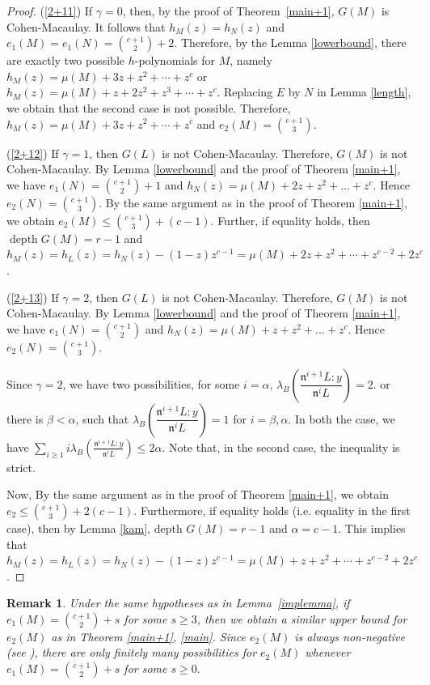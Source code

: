\documentclass[11pt]{amsart}
\theoremstyle{plain}
\newtheorem{remark}[theorem]{Remark}
\newcommand{\n}{\mathfrak{n}}
\newcommand{\depth}{\operatorname{depth}}
\theoremstyle{plain}
\begin{document}
\begin{proof}
   (\ref{2+11}) If $\gamma=0$, then, by the proof of Theorem~\ref{main+1}, $G(M)$ is Cohen-Macaulay. It follows that $h_M(z)=h_N(z)$ and $ e_1(M)=e_1(N)=\binom{c+1}{2}+2$. Therefore, by the Lemma \ref{lowerbound}, there are exactly two possible $h$-polynomials for $M$, namely $h_M(z)=\mu(M)+3z+z^2+\cdots+z^c$ or $h_M(z)=\mu(M)+z+2z^2+z^3+\cdots+z^c$. Replacing $E$ by $N$ in Lemma \ref{length}, we obtain that the second case is not possible. Therefore, $h_M(z)=\mu(M)+3z+z^2+\cdots+z^c$ and $ e_2(M)=\binom{c+1}{3}$.

\noindent
   (\ref{2+12})  If $\gamma=1$, then $G(L)$ is not Cohen-Macaulay. Therefore, $G(M)$ is not Cohen-Macaulay. By Lemma \ref{lowerbound} and the proof of Theorem \ref{main+1}, we have $ e_1(N)=\binom{c+1}{2}+1$ and $h_N(z)=\mu(M)+2z+z^2+\ldots+ z^{c}.$ Hence $ e_2(N)=\binom{c+1}{3}$. By the same argument as in the proof of Theorem \ref{main+1}, we obtain $  e_2(M)\leq \binom{c+1}{3}+(c-1)$. Further, if equality holds, then $\depth G(M)= r-1$ and $h_M(z)=h_L(z)=h_N(z)-(1-z)z^{c-1}
=\mu(M)+2z+z^2+\cdots+z^{c-2}+2z^c$.

\noindent
(\ref{2+13}) If $\gamma =2$, then $G(L)$ is not Cohen-Macaulay. Therefore, $G(M)$ is not Cohen-Macaulay. By Lemma \ref{lowerbound} and the proof of Theorem \ref{main+1}, we have $ e_1(N)=\binom{c+1}{2}$ and $h_N(z)=\mu(M)+z+z^2+\ldots+ z^{c}.$ Hence $ e_2(N)=\binom{c+1}{3}$. 

Since $\gamma=2$, we have two possibilities,  for some $i=\alpha$, $\lambda_B \left(\dfrac{\n^{i+1}L:y}{\n^iL}\right)=2.$ or there is $\beta < \alpha$, such that  $\lambda_B \left(\dfrac{\n^{i+1}L:y}{\n^iL}\right)=1$ for $i=\beta ,\alpha$. In both the case,  we have $\displaystyle  \sum_{i\geq 1}i\lambda_B\left(\frac{{\n}^{i+1}L:y}{{\n}^iL}\right)\leq 2\alpha$. Note that, in the second case, the inequality is strict.

Now, By the same argument as in the proof of Theorem \ref{main+1}, we obtain $ e_2\leq \binom{c+1}{3}+2(c-1)$. Furthermore, if equality holds (i.e. equality in the first case), then by Lemma \ref{kam}, depth $G(M)=r-1$ and $\alpha=c-1.$ This implies that $h_M(z)=h_L(z)=h_N(z)-(1-z)z^{c-1}
=\mu(M)+z+z^2+\cdots+z^{c-2}+2z^c$.
\end{proof}

\begin{remark}
   Under the same hypotheses as in Lemma~\ref{implemma}, if $e_1(M)=\binom{c+1}{2}+s$ for some $s\geq3$, then we obtain a similar upper bound for $e_2(M)$ as in Theorem \ref{main+1}, \ref{main}. Since $e_2(M)$ is always non-negative (see \cite[Proposition 3.1]{rossi2010hilbert}), there are only finitely many possibilities for $e_2(M)$ whenever $e_1(M)=\binom{c+1}{2}+s$ for some $s\geq 0.$
\end{remark}
\end{document}
